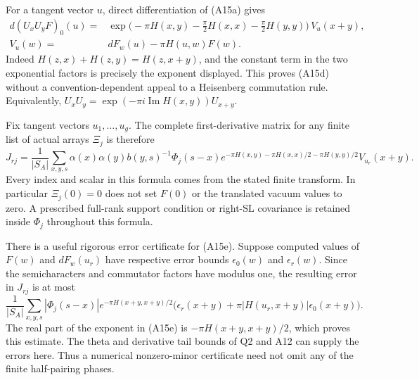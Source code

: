 \documentclass[11pt]{article}
\theoremstyle{definition}\newtheorem{definition}[theorem]{Definition}\newtheorem{remark}[theorem]{Remark}
\begin{document}
For a tangent vector $u$, direct differentiation of (A15a) gives
\[
 \begin{split}
 d(U_xU_yF)_0(u)
  ={}&\exp\bigl(-\pi H(x,y)
              -\tfrac\pi2H(x,x)-\tfrac\pi2H(y,y)\bigr)\,V_u(x+y),\\
 V_u(w)={}&dF_w(u)-\pi H(u,w)F(w).
 \end{split}
 \tag{A15d}
\]
Indeed $H(z,x)+H(z,y)=H(z,x+y)$, and the constant term in
the two exponential factors is precisely the exponent displayed.
This proves (A15d) without a convention-dependent appeal to a
Heisenberg commutation rule.  Equivalently,
$U_xU_y=\exp(-\pi i\operatorname{Im}H(x,y))U_{x+y}$.

Fix tangent vectors $u_1,\ldots,u_g$.  The complete first-derivative
matrix for any finite list of actual arrays $\Xi_j$ is therefore
\[
 J_{rj}=\frac1{|S_A|}
  \sum_{x,y,s}\alpha(x)\alpha(y)b(y,s)^{-1}
       \Phi_j(s-x)
       e^{-\pi H(x,y)-\pi H(x,x)/2-\pi H(y,y)/2}
       V_{u_r}(x+y).
 \tag{A15e}
\]
Every index and scalar in this formula comes from the stated finite
transform.  In particular $\Xi_j(0)=0$ does not set $F(0)$ or the
translated vacuum values to zero.  A prescribed full-rank support
condition or right-$\mathrm{SL}$ covariance is retained inside
$\Phi_j$ throughout this formula.

There is a useful rigorous error certificate for (A15e).  Suppose
computed values of $F(w)$ and $dF_w(u_r)$ have respective error bounds
$\epsilon_0(w)$ and $\epsilon_r(w)$.  Since the semicharacters and
commutator factors have modulus one, the resulting error in $J_{rj}$
is at most
\[
 \frac1{|S_A|}\sum_{x,y,s}|\Phi_j(s-x)|
 e^{-\pi H(x+y,x+y)/2}
 \bigl(\epsilon_r(x+y)+\pi|H(u_r,x+y)|\epsilon_0(x+y)\bigr).
 \tag{A15f}
\]
The real part of the exponent in (A15e) is
$-\pi H(x+y,x+y)/2$, which proves this estimate.  The theta and
derivative tail bounds of Q2 and A12 can supply the errors here.
Thus a numerical nonzero-minor certificate need not omit any of the
finite half-pairing phases.
\end{document}
